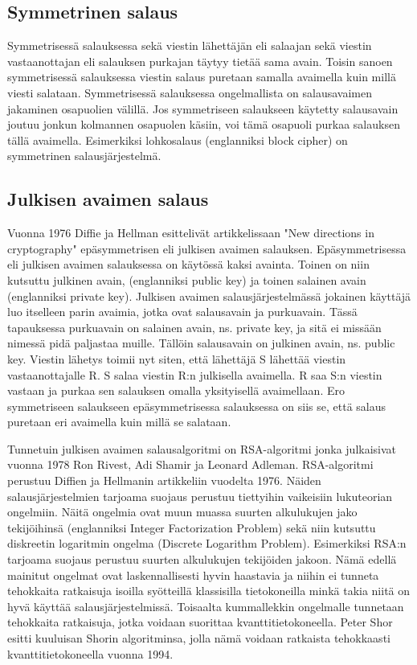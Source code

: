 \subsection{Symmetrinen salaus}
 Symmetrisessä salauksessa sekä viestin lähettäjän eli salaajan sekä viestin vastaanottajan eli salauksen purkajan täytyy tietää sama avain. Toisin sanoen symmetrisessä salauksessa viestin salaus puretaan samalla avaimella kuin millä viesti salataan.  Symmetrisessä salauksessa ongelmallista on salausavaimen jakaminen osapuolien välillä. Jos symmetriseen salaukseen käytetty salausavain joutuu jonkun kolmannen osapuolen käsiin, voi tämä osapuoli purkaa salauksen tällä avaimella. Esimerkiksi lohkosalaus (englanniksi block cipher) on symmetrinen salausjärjestelmä.
 
 \subsection{Julkisen avaimen salaus}
 Vuonna 1976 Diffie ja Hellman esittelivät artikkelissaan "New directions in cryptography" epäsymmetrisen eli julkisen avaimen salauksen. Epäsymmetrisessa eli julkisen avaimen salauksessa on käytössä kaksi avainta. Toinen on niin kutsuttu julkinen avain, (englanniksi public key) ja toinen salainen avain (englanniksi private key). Julkisen avaimen salausjärjestelmässä jokainen käyttäjä luo itselleen parin avaimia, jotka ovat salausavain ja purkuavain. Tässä tapauksessa purkuavain on salainen avain, ns. private key,  ja sitä ei missään nimessä pidä paljastaa muille. Tällöin salausavain on julkinen avain, ns. public key. Viestin lähetys toimii nyt siten, että lähettäjä S lähettää viestin vastaanottajalle R. S salaa viestin R:n julkisella avaimella. R saa S:n viestin vastaan ja purkaa sen salauksen omalla yksityisellä avaimellaan. Ero symmetriseen salaukseen epäsymmetrisessa salauksessa on siis se, että salaus puretaan eri avaimella kuin millä se salataan.
 
 Tunnetuin julkisen avaimen salausalgoritmi on RSA-algoritmi jonka julkaisivat vuonna 1978 Ron Rivest, Adi Shamir ja Leonard Adleman. RSA-algoritmi perustuu Diffien ja Hellmanin artikkeliin vuodelta 1976. Näiden salausjärjestelmien tarjoama suojaus perustuu tiettyihin vaikeisiin lukuteorian ongelmiin. Näitä ongelmia ovat muun muassa suurten alkulukujen jako tekijöihinsä (englanniksi Integer Factorization Problem) sekä niin kutsuttu diskreetin logaritmin ongelma (Discrete Logarithm Problem). Esimerkiksi RSA:n tarjoama suojaus perustuu suurten alkulukujen tekijöiden jakoon. Nämä edellä mainitut ongelmat ovat laskennallisesti hyvin haastavia ja niihin ei tunneta tehokkaita ratkaisuja isoilla syötteillä klassisilla tietokoneilla minkä takia niitä on hyvä käyttää salausjärjestelmissä. Toisaalta kummallekkin ongelmalle tunnetaan tehokkaita ratkaisuja, jotka voidaan suorittaa kvanttitietokoneella. Peter Shor esitti kuuluisan Shorin algoritminsa, jolla nämä voidaan ratkaista tehokkaasti kvanttitietokoneella vuonna 1994.
 
